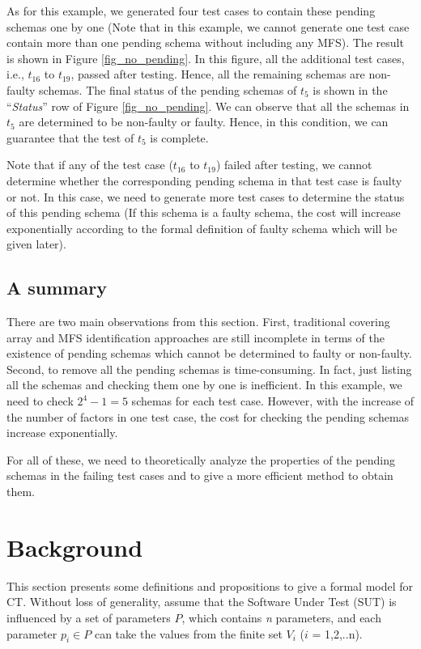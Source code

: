 As for this example, we generated four test cases to contain these pending schemas one by one (Note that in this example, we cannot generate one test case contain more than one pending schema without including any MFS). The result is shown in Figure \ref{fig_no_pending}. In this figure, all the additional test cases, i.e., $t_{16}$ to $t_{19}$, passed after testing. Hence, all the remaining schemas are non-faulty schemas. The final status of the pending schemas of $t_{5}$ is shown in the ``\emph{Status}'' row of Figure \ref{fig_no_pending}. We can observe that all the schemas in $t_{5}$ are determined to be non-faulty or faulty. Hence, in this condition, we can guarantee that the test of $t_{5}$ is complete.

Note that if any of the test case ($t_{16}$ to $t_{19}$) failed after testing, we cannot determine whether the corresponding pending schema in that test case is faulty or not.  In this case, we need to generate more test cases to determine the status of this pending schema (If this schema is a faulty schema, the cost will increase exponentially according to the formal definition of faulty schema which will be given later).

\subsection{A summary}

There are two main observations from this section. First, traditional covering array and MFS identification approaches are still incomplete in terms of the existence of pending schemas which cannot be determined to faulty or non-faulty. Second, to remove all the pending schemas is time-consuming. In fact, just listing all the schemas and checking them one by one is inefficient. In this example, we need to check $2^{4} - 1 = 5$ schemas for each test case. However, with the increase of the number of factors in one test case, the cost for checking the pending schemas increase exponentially.

For all of these, we need to theoretically analyze the properties of the pending schemas in the failing test cases and to give a more efficient method to obtain them.

\section{Background}\label{sec:back}
This section presents some definitions and propositions to give a formal model for CT.
Without loss of generality, assume that the Software Under Test (SUT) is influenced by a set of parameters $P$, which contains \emph{n} parameters, and each parameter $p_{i} \in P$ can take the values from the finite set $V_{i}$ ($i$ = 1,2,..n).

